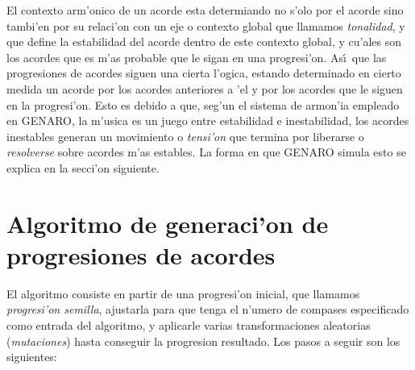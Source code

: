 El contexto arm'onico de un acorde esta determiando no s'olo por el acorde sino tambi'en por su relaci'on con un eje o contexto global que llamamos \emph{tonalidad}, y que define la estabilidad del acorde dentro de este contexto global, y cu'ales son los acordes que es m'as probable que le sigan en una progresi'on. As\'\i ~que las progresiones de acordes siguen una cierta l'ogica, estando determinado en cierto medida un acorde por los acordes anteriores a 'el y por los acordes que le siguen en la progresi'on. Esto es debido a que, seg'un el sistema de armon'ia empleado en GENARO, la m'usica es un juego entre estabilidad e inestabilidad, los acordes inestables generan un movimiento o \emph{tensi'on} que termina por liberarse o \emph{resolverse} sobre acordes m'as estables. La forma en que GENARO simula esto se explica en la secci'on siguiente.

\section {Algoritmo de generaci'on de progresiones de acordes}
El algoritmo consiste en partir de una progresi'on inicial, que llamamos \emph{progresi'on semilla}, ajustarla para que tenga el n'umero de compases especificado como entrada del algoritmo, y aplicarle varias transformaciones aleatorias (\emph{mutaciones}) hasta conseguir la progresion resultado. Los pasos a seguir son los siguientes:

